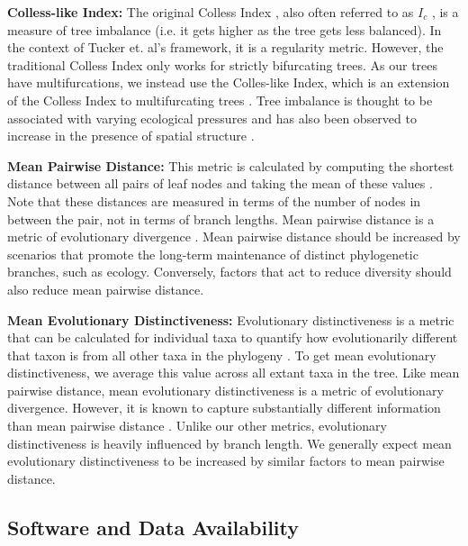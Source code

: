\textbf{Colless-like Index:} The original Colless Index \citep{collessReviewPhylogeneticsTheory1982}, also often referred to as $I_c$ \citep{shaoTreeBalance1990}, is a measure of tree imbalance (i.e. it gets higher as the tree gets less balanced). In the context of Tucker et. al's framework, it is a regularity metric. However, the traditional Colless Index only works for strictly bifurcating trees. As our trees have multifurcations, we instead use the Colles-like Index, which is an extension of the Colless Index to multifurcating trees \citep{mirSoundCollesslikeBalance2018}. Tree imbalance is thought to be associated with varying ecological pressures \citep{chamberlainPhylogeneticTreeShape2014, burressEcologicalOpportunityAlters} and has also been observed to increase in the presence of spatial structure \citep{scottInferringTumorProliferative2020}.

\textbf{Mean Pairwise Distance:} This metric is calculated by computing the shortest distance between all pairs of leaf nodes and taking the mean of these values \citep{webbExploringPhylogeneticStructure2000}. Note that these distances are measured in terms of the number of nodes in between the pair, not in terms of branch lengths. Mean pairwise distance is a metric of evolutionary divergence \citep{tuckerGuidePhylogeneticMetrics2017}. Mean pairwise distance should be increased by scenarios that promote the long-term maintenance of distinct phylogenetic branches, such as ecology. Conversely, factors that act to reduce diversity should also reduce mean pairwise distance.

\textbf{Mean Evolutionary Distinctiveness:} Evolutionary distinctiveness is a metric that can be calculated for individual taxa to quantify how evolutionarily different that taxon is from all other taxa in the phylogeny \citep{isaacMammalsEDGEConservation2007}. To get mean evolutionary distinctiveness, we average this value across all extant taxa in the tree. Like mean pairwise distance, mean evolutionary distinctiveness is a metric of evolutionary divergence. However, it is known to capture substantially different information than mean pairwise distance \citep{tuckerGuidePhylogeneticMetrics2017}. Unlike our other metrics, evolutionary distinctiveness is heavily influenced by branch length. We generally expect mean evolutionary distinctiveness to be increased by similar factors to mean pairwise distance.


\subsection{Software and Data Availability}


